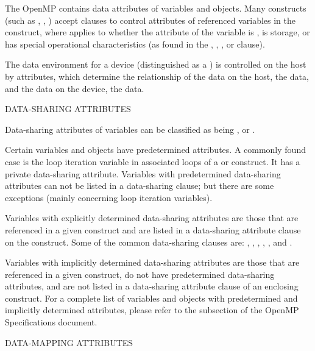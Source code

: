 \label{chap:data_environment}
The OpenMP  contains data attributes of variables and
objects.  Many constructs (such as , , ) 
accept clauses to control  attributes
of referenced variables in the construct, where  applies to
whether the attribute of the variable is , 
is  storage, or has special operational characteristics 
(as found in the , , , or  clause).

The data environment for a device (distinguished as a )
is controlled on the host by  attributes, which determine the
relationship of the data on the host, the  data, and the data on the
device, the  data.

\bigskip
DATA-SHARING ATTRIBUTES

Data-sharing attributes of variables can be classified as being ,
 or .

Certain variables and objects have predetermined attributes.  
A commonly found case is the loop iteration variable in associated loops 
of a  or  construct. It has a private data-sharing attribute.
Variables with predetermined data-sharing attributes can not be listed in a data-sharing clause; but there are some
exceptions (mainly concerning loop iteration variables).

Variables with explicitly determined data-sharing attributes are those that are
referenced in a given construct and are listed in a data-sharing attribute
clause on the construct. Some of the common data-sharing clauses are:
, , , , 
, and . %

Variables with implicitly determined data-sharing attributes are those
that are referenced in a given construct, do not have predetermined
data-sharing attributes, and are not listed in a data-sharing
attribute clause of an enclosing construct.
For a complete list of variables and objects with predetermined and
implicitly determined attributes, please refer to the
subsection of the OpenMP Specifications document.  

\bigskip
DATA-MAPPING ATTRIBUTES

